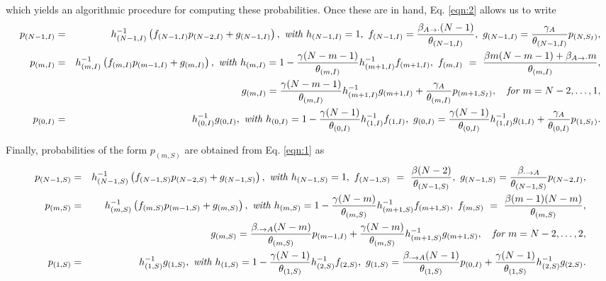 \documentclass[10pt,A4paper]{article}
\begin{document}
\par\noindent which yields an algorithmic procedure for computing these probabilities. Once these are in hand, Eq. \eqref{eqn:2} allows us to write
\begin{eqnarray*}
 p_{(N-1,I)} &=& h_{(N-1,I)}^{-1}\left(f_{(N-1,I)}p_{(N-2,I)}+g_{(N-1,I)}\right),\ \hbox{\it with } h_{(N-1,I)}=1,\ f_{(N-1,I)}=\frac{\beta_{A\rightarrow\cdot}(N-1)}{\theta_{(N-1,I)}},\ g_{(N-1,I)}=\frac{\gamma_A}{\theta_{(N-1,I)}}p_{(N,S_I)},\\
 p_{(m,I)} &=& h_{(m,I)}^{-1}\left(f_{(m,I)}p_{(m-1,I)}+g_{(m,I)}\right),\ \hbox{\it with } h_{(m,I)}=1-\frac{\gamma(N-m-1)}{\theta_{(m,I)}}h_{(m+1,I)}^{-1}f_{(m+1,I)},\ f_{(m,I)} ~=~ \frac{\beta m(N-m-1)+\beta_{A\rightarrow\cdot}m}{\theta_{(m,I)}},\\
&& g_{(m,I)}=\frac{\gamma (N-m-1)}{\theta_{(m,I)}}h_{(m+1,I)}^{-1}g_{(m+1,I)}+\frac{\gamma_A}{\theta_{(m,I)}}p_{(m+1,S_I)},\quad \hbox{\it for } m=N-2,\dots,1,\\
 p_{(0,I)} &=& h_{(0,I)}^{-1}g_{(0,I)},\ \hbox{\it with } h_{(0,I)}=1-\frac{\gamma(N-1)}{\theta_{(0,I)}}h_{(1,I)}^{-1}f_{(1,I)},\ g_{(0,I)}=\frac{\gamma(N-1)}{\theta_{(0,I)}}h_{(1,I)}^{-1}g_{(1,I)}+\frac{\gamma_A}{\theta_{(0,I)}}p_{(1,S_I)}.
\end{eqnarray*}

\par\noindent Finally, probabilities of the form $p_{(m,S)}$ are obtained from Eq. \eqref{eqn:1} as
\begin{eqnarray*}
 p_{(N-1,S)} &=& h_{(N-1,S)}^{-1}\left(f_{(N-1,S)}p_{(N-2,S)}+g_{(N-1,S)}\right),\ \hbox{\it with } h_{(N-1,S)}=1,\ f_{(N-1,S)} ~=~ \frac{\beta(N-2)}{\theta_{(N-1,S)}},\ g_{(N-1,S)}=\frac{\beta_{\cdot\rightarrow A}}{\theta_{(N-1,S)}}p_{(N-2,I)},\\
 p_{(m,S)} &=& h_{(m,S)}^{-1}\left(f_{(m,S)}p_{(m-1,S)}+g_{(m,S)}\right),\ \hbox{\it with } h_{(m,S)}=1-\frac{\gamma(N-m)}{\theta_{(m,S)}}h_{(m+1,S)}^{-1}f_{(m+1,S)},\ f_{(m,S)} ~=~ \frac{\beta (m-1)(N-m)}{\theta_{(m,S)}},\\
&& g_{(m,S)}=\frac{\beta_{\cdot\rightarrow A}(N-m)}{\theta_{(m,S)}}p_{(m-1,I)}+\frac{\gamma(N-m)}{\theta_{(m,S)}}h_{(m+1,S)}^{-1}g_{(m+1,S)},\quad \hbox{\it for } m=N-2,\dots,2,\\
 p_{(1,S)} &=& h_{(1,S)}^{-1}g_{(1,S)},\ \hbox{\it with } h_{(1,S)}=1-\frac{\gamma(N-1)}{\theta_{(1,S)}}h_{(2,S)}^{-1}f_{(2,S)},\ g_{(1,S)}=\frac{\beta_{\cdot\rightarrow A} (N-1)}{\theta_{(1,S)}}p_{(0,I)}+\frac{\gamma(N-1)}{\theta_{(1,S)}}h_{(2,S)}^{-1}g_{(2,S)}.
\end{eqnarray*}
\end{document}
